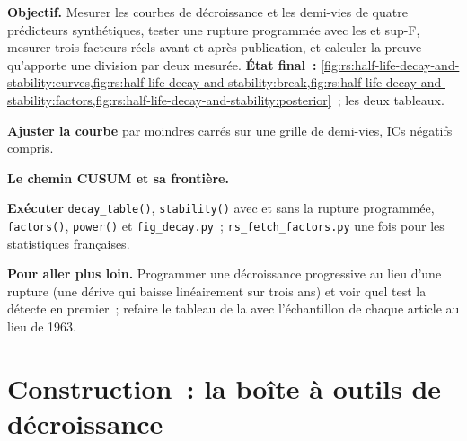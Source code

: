 \begin{tutorial}
\textbf{Objectif.} Mesurer les courbes de décroissance et les demi-vies de quatre prédicteurs synthétiques, tester une rupture programmée avec les  et sup-F, mesurer
trois facteurs réels avant et après publication, et calculer la preuve qu'apporte une division par deux mesurée. \textbf{État final~:}
\cref{fig:rs:half-life-decay-and-stability:curves,fig:rs:half-life-decay-and-stability:break,fig:rs:half-life-decay-and-stability:factors,fig:rs:half-life-decay-and-stability:posterior}~;
les deux tableaux.
\begin{tutsteps}
\item \textbf{Ajuster la courbe} par moindres carrés sur une grille de demi-vies, ICs négatifs compris.
\label{lst:rs:half-life-decay-and-stability:fit}
\item \textbf{Le chemin CUSUM et sa frontière.}
\label{lst:rs:half-life-decay-and-stability:cusum}
\item \textbf{Exécuter} \texttt{decay\_table()}, \texttt{stability()} avec et sans la rupture programmée, \texttt{factors()}, \texttt{power()} et
\texttt{fig\_decay.py}~; \texttt{rs\_fetch\_factors.py} une fois pour les statistiques françaises.
\end{tutsteps}
\textbf{Pour aller plus loin.} Programmer une décroissance progressive au lieu d'une rupture (une dérive qui baisse linéairement sur trois ans) et voir quel test la détecte
en premier~; refaire le tableau de la  avec l'échantillon de chaque article au lieu de 1963.
\end{tutorial}

\section{Construction~: la boîte à outils de décroissance}\label{bld:rs:half-life-decay-and-stability:decay}

